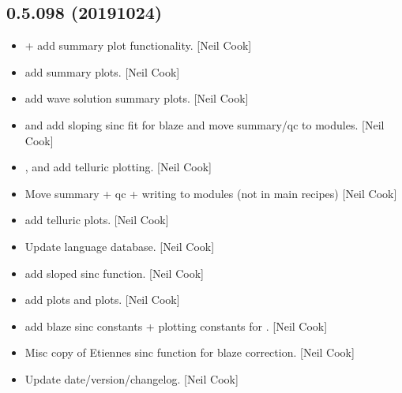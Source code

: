 \documentclass[a4paper,10pt,english]{report}
\begin{document}
\subsection{0.5.098 (2019\sphinxhyphen{}10\sphinxhyphen{}24)}
\label{\detokenize{misc/changelog:id63}}\begin{itemize}
\item {} 
 +  \sphinxhyphen{} add summary
plot functionality. {[}Neil Cook{]}

\item {} 
 \sphinxhyphen{} add summary plots. {[}Neil Cook{]}

\item {} 
 \sphinxhyphen{} add wave solution
summary plots. {[}Neil Cook{]}

\item {} 
 and  \sphinxhyphen{} add sloping sinc fit for blaze and
move summary/qc to modules. {[}Neil Cook{]}

\item {} 
,  and  \sphinxhyphen{}
add telluric plotting. {[}Neil Cook{]}

\item {} 
Move summary + qc + writing to modules (not in main recipes) {[}Neil
Cook{]}

\item {} 
 \sphinxhyphen{} add telluric plots. {[}Neil Cook{]}

\item {} 
Update language database. {[}Neil Cook{]}

\item {} 
 \sphinxhyphen{} add sloped sinc function. {[}Neil Cook{]}

\item {} 
 \sphinxhyphen{} add  plots
and  plots. {[}Neil Cook{]}

\item {} 
 \sphinxhyphen{} add blaze sinc constants + plotting
constants for . {[}Neil Cook{]}

\item {} 
Misc \sphinxhyphen{} copy of Etiennes sinc function for blaze correction. {[}Neil
Cook{]}

\item {} 
Update date/version/changelog. {[}Neil Cook{]}

\end{itemize}
\end{document}
